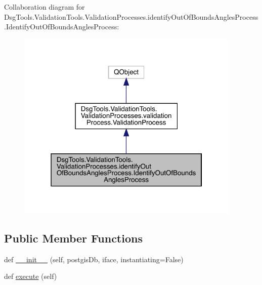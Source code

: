 Collaboration diagram for Dsg\+Tools.\+Validation\+Tools.\+Validation\+Processes.\+identify\+Out\+Of\+Bounds\+Angles\+Process.\+Identify\+Out\+Of\+Bounds\+Angles\+Process\+:
\nopagebreak
\begin{figure}[H]
\begin{center}
\leavevmode
\includegraphics[width=303pt]{class_dsg_tools_1_1_validation_tools_1_1_validation_processes_1_1identify_out_of_bounds_angles_p078c5d3b9730c15d6c6ea28199d9a5b8}
\end{center}
\end{figure}
\subsection*{Public Member Functions}
\begin{DoxyCompactItemize}
\item 
def \mbox{\hyperlink{class_dsg_tools_1_1_validation_tools_1_1_validation_processes_1_1identify_out_of_bounds_angles_p018c2eea3681ae6533cd0c1659513e7b_ad1a2a40584733f237e2b68d7e19df515}{\+\_\+\+\_\+init\+\_\+\+\_\+}} (self, postgis\+Db, iface, instantiating=False)
\item 
def \mbox{\hyperlink{class_dsg_tools_1_1_validation_tools_1_1_validation_processes_1_1identify_out_of_bounds_angles_p018c2eea3681ae6533cd0c1659513e7b_a4ac273d1fb6b14b7b2a25d9d27d38b46}{execute}} (self)
\end{DoxyCompactItemize}
